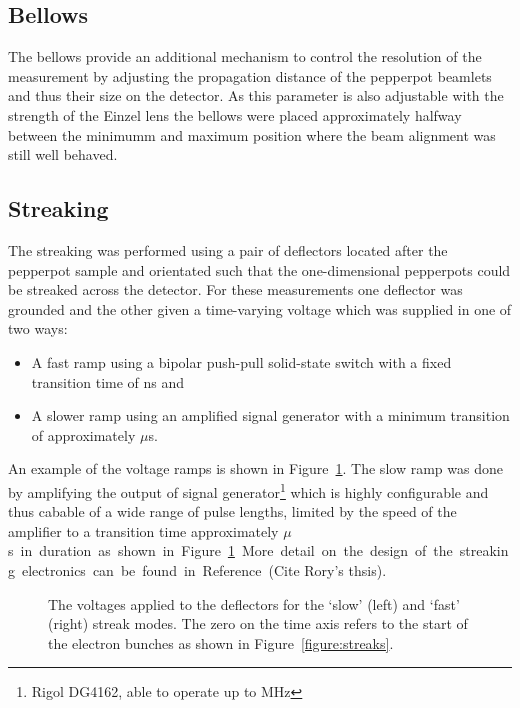 \subsection{Bellows}

The bellows provide an additional mechanism to control the resolution of the measurement by adjusting the propagation distance of the pepperpot beamlets and thus their size on the detector.
As this parameter is also adjustable with the strength of the Einzel lens the bellows were placed approximately halfway between the minimumm and maximum position where the beam alignment was still well behaved.

\subsection{Streaking}
The streaking was performed using a pair of deflectors located after the pepperpot sample and orientated such that the one-dimensional pepperpots could be streaked across the detector.
For these measurements one deflector was grounded and the other given a time-varying voltage which was supplied in one of two ways:
\begin{itemize}
\item A fast ramp using a bipolar push-pull solid-state switch with a fixed transition time of \unit[10]{ns} and
\item A slower ramp using an amplified signal generator with a minimum transition of approximately \unit[10]{$\mu$s}.
\end{itemize}
An example of the voltage ramps is shown in Figure~\ref{figure:deflector_voltages}. The slow ramp was done by amplifying the output of signal generator\footnote{Rigol DG4162, able to operate up to \unit[160]{MHz}} which is highly configurable and thus cabable of a wide range of pulse lengths, limited by the speed of the amplifier to a transition time approximately \unit[10]{$\mu$s} in duration as shown in Figure~\ref{figure:deflector_voltages}.
More detail on the design of the streaking electronics can be found in Reference~{\color{red}(Cite Rory's thsis)}.

\begin{figure}
    \center
    
    \caption{The voltages applied to the deflectors for the `slow' (left) and `fast' (right) streak modes. The zero on the time axis refers to the start of the electron bunches as shown in Figure~\ref{figure:streaks}.}
    \label{figure:deflector_voltages}
\end{figure}

